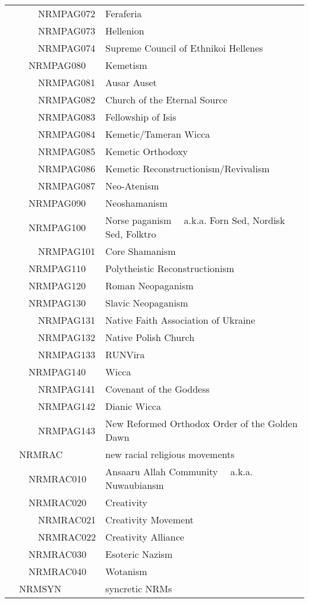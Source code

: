 \documentclass[12pt]{article}
\begin{document}
\begin{tiny}
\begin{center}
\begin{longtable}{|l|l|}
~~~~~~NRMPAG072 & Feraferia \\
~~~~~~NRMPAG073 & Hellenion \\
~~~~~~NRMPAG074 & Supreme Council of Ethnikoi Hellenes \\
~~~~NRMPAG080 & Kemetism \\
~~~~~~NRMPAG081 & Ausar Auset	~~ \\
~~~~~~NRMPAG082 & Church of the Eternal Source \\
~~~~~~NRMPAG083 & Fellowship of Isis \\
~~~~~~NRMPAG084 & Kemetic/Tameran Wicca \\
~~~~~~NRMPAG085 & Kemetic Orthodoxy \\
~~~~~~NRMPAG086 & Kemetic Reconstructionism/Revivalism \\
~~~~~~NRMPAG087 & Neo-Atenism \\
~~~~NRMPAG090 & Neoshamanism \\
~~~~NRMPAG100 & Norse paganism	~~a.k.a. Forn Sed, Nordisk Sed, Folktro \\
~~~~~~NRMPAG101 & Core Shamanism \\
~~~~NRMPAG110 & Polytheistic Reconstructionism \\
~~~~NRMPAG120 & Roman Neopaganism \\
~~~~NRMPAG130 & Slavic Neopaganism \\
~~~~~~NRMPAG131 & Native Faith Association of Ukraine \\
~~~~~~NRMPAG132 & Native Polish Church \\
~~~~~~NRMPAG133 & RUNVira \\
~~~~NRMPAG140 & Wicca \\
~~~~~~NRMPAG141 & Covenant of the Goddess \\
~~~~~~NRMPAG142 & Dianic Wicca \\
~~~~~~NRMPAG143 & New Reformed Orthodox Order of the Golden Dawn \\
~~NRMRAC & new racial religious movements \\
~~~~NRMRAC010 & Ansaaru Allah Community	~~a.k.a. Nuwaubiansm \\
~~~~NRMRAC020 & Creativity \\
~~~~~~NRMRAC021 & Creativity Movement \\
~~~~~~NRMRAC022 & Creativity Alliance \\
~~~~NRMRAC030 & Esoteric Nazism \\
~~~~NRMRAC040 & Wotanism \\
~~NRMSYN & syncretic NRMs \\

\end{longtable}
\end{center}
\end{tiny}
\end{document}
